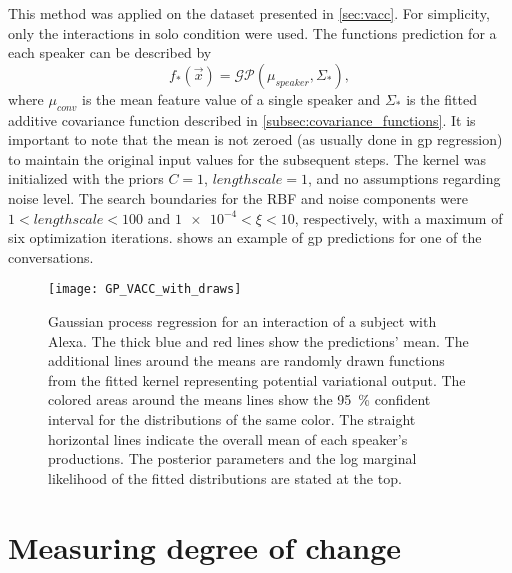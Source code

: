 This method was applied on the dataset presented in \cref{sec:vacc}.
For simplicity, only the interactions in solo condition were used.
The functions prediction for a each speaker can be described by
%
\begin{equation}
	\label{eq:gp_function_prediction}
	f_*(\vec{x}) = \mathcal{GP}(\mu_{speaker}, \Sigma_*),
\end{equation}
%
where $\mu_{conv}$ is the mean feature value of a single speaker and $\Sigma_*$ is the fitted additive covariance function described in \cref{subsec:covariance_functions}.
It is important to note that the mean is not zeroed (as usually done in \ac{gp} regression) to maintain the original input values for the subsequent steps.
The kernel was initialized with the priors $C = 1$, $lengthscale = 1$, and no assumptions regarding noise level.
The search boundaries for the RBF and noise components were $1 < lengthscale < 100$ and $\num{1e-4} < \xi < 10$, respectively, with a maximum of six optimization iterations. %
 shows an example of \ac{gp} predictions for one of the conversations. %
%
\begin{figure}[t]
	\centering
	\texttt{[image: GP\_VACC\_with\_draws]}
	\caption[Gaussian process regression on conversation with Alexa]
		{Gaussian process regression for an interaction of a subject with Alexa.
		 The thick blue and red lines show the predictions' mean.
		 The additional lines around the means are randomly drawn functions from the fitted kernel representing potential variational output.
		 The colored areas around the means lines show the \SI{95}{\percent} confident interval for the distributions of the same color.
		 The straight horizontal lines indicate the overall mean of each speaker's productions.
		 The posterior parameters and the log marginal likelihood of the fitted distributions are stated at the top.}
	\label{fig:gp_vacc}
\end{figure}

\section{Measuring degree of change}
\label{sec:measuring_changes}

